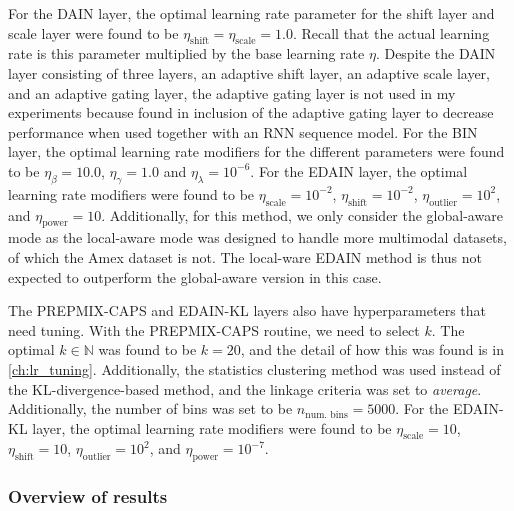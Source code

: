 \documentclass{statsmsc}
\begin{document}
{%
For the DAIN layer, the optimal learning rate parameter for the shift layer
and scale layer were found to be $\eta_{\textrm{shift}}=\eta_{\textrm{scale}}=1.0$. Recall that
the actual learning rate is this parameter multiplied by the base learning rate $\eta$.
Despite the \ac{DAIN} layer consisting of three layers, an adaptive shift layer, an adaptive
scale layer, and an adaptive gating layer, the adaptive gating layer is not used in my
experiments because \cite{dain} found in inclusion of the adaptive gating layer to decrease
performance when used together with an \ac{RNN} sequence model.
For the \ac{BIN} layer, the optimal learning rate modifiers for the different parameters were
found to be $\eta_\beta=10.0$, $\eta_\gamma=1.0$ and $\eta_\lambda=10^{-6}$.
For the \ac{EDAIN} layer, the optimal learning rate modifiers were found to be
$\eta_{\textrm{scale}}=10^{-2}$, $\eta_{\textrm{shift}}=10^{-2}$, $\eta_{\textrm{outlier}}=10^{2}$,
and $\eta_{\textrm{power}}=10$. Additionally, for this method, we only consider the global-aware
mode as the local-aware mode was designed to handle more multimodal datasets, of which the Amex
dataset is not. The local-ware \ac{EDAIN} method is thus not expected to outperform the global-aware
version in this case.

The \ac{PREPMIX-CAPS} and \ac{EDAIN-KL} layers also have hyperparameters that need
tuning. With the \ac{PREPMIX-CAPS} routine, we need to select $k$. The optimal $k \in \mathbb{N}$
was found to be $k=20$, and the detail of how this was found is in \cref{ch:lr_tuning}.
Additionally, the statistics clustering method was used instead of the \ac{KL-divergence}-based
method, and the linkage criteria was set to \textit{average}. Additionally, the number of bins
was set to be $n_{\textrm{num. bins}}=5000$. For the \ac{EDAIN-KL} layer, the optimal learning
rate modifiers were found to be
$\eta_{\textrm{scale}}=10$, $\eta_{\textrm{shift}}=10$, $\eta_{\textrm{outlier}}=10^{2}$,
and $\eta_{\textrm{power}}=10^{-7}$.


\subsubsection{Overview of results}%
\label{ssub:amex-results}

}
\end{document}
